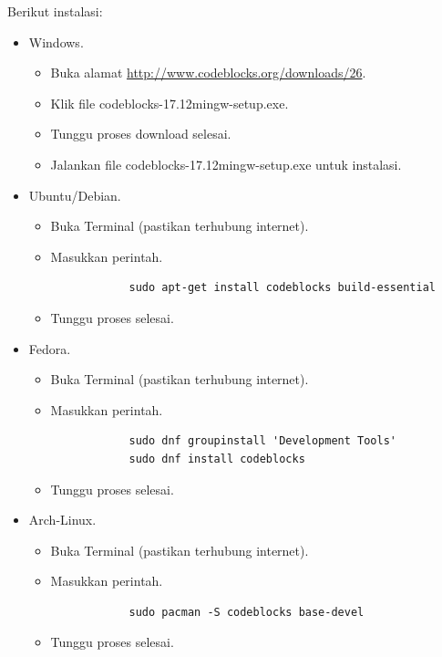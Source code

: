 \documentclass[12pt,]{article}
\begin{document}
	Berikut instalasi:
	\begin{itemize}
		\item Windows.
		\begin{itemize}
			\item Buka alamat \url{http://www.codeblocks.org/downloads/26}.
			\item Klik file codeblocks-17.12mingw-setup.exe.
			\item Tunggu proses download selesai.
			\item Jalankan file codeblocks-17.12mingw-setup.exe untuk instalasi.
		\end{itemize}
		
		\item Ubuntu/Debian.
		\begin{itemize}
			\item Buka Terminal (pastikan terhubung internet).
			\item Masukkan perintah.
			\begin{verbatim}
			sudo apt-get install codeblocks build-essential
			\end{verbatim}
			\item Tunggu proses selesai.
		\end{itemize}
		
		\item Fedora.
		\begin{itemize}
			\item Buka Terminal (pastikan terhubung internet).
			\item Masukkan perintah.
			\begin{verbatim}
			sudo dnf groupinstall 'Development Tools'
			sudo dnf install codeblocks
			\end{verbatim}
			\item Tunggu proses selesai.
		\end{itemize}
		
		\item Arch-Linux.
		\begin{itemize}
			\item Buka Terminal (pastikan terhubung internet).
			\item Masukkan perintah.
			\begin{verbatim}
			sudo pacman -S codeblocks base-devel 
			\end{verbatim}
			\item Tunggu proses selesai.
		\end{itemize}
		
	\end{itemize}
	
\end{document}
